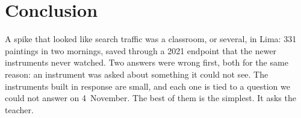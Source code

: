 \documentclass[10pt,letterpaper,twocolumn]{article}
\begin{document}
\section{Conclusion}

A spike that looked like search traffic was a classroom, or several, in
Lima: 331 paintings in two mornings, saved through a 2021 endpoint that
the newer instruments never watched. Two answers were wrong first, both
for the same reason: an instrument was asked about something it could
not see. The instruments built in response are small, and each one is
tied to a question we could not answer on 4~November. The best of them
is the simplest. It asks the teacher.


\setlength{\bibsep}{1.2pt plus 0.2ex}
{\footnotesize

}
\end{document}
